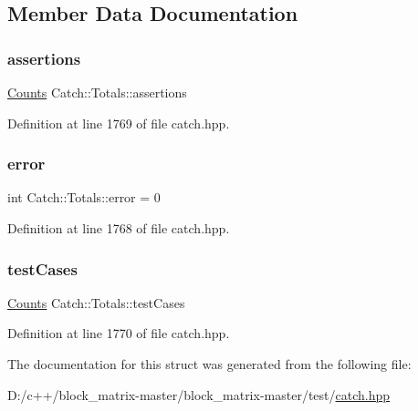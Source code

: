 \subsection{Member Data Documentation}
\mbox{\label{struct_catch_1_1_totals_a885ded66df752147b30c3d45aa602ec9}} 
\subsubsection{\texorpdfstring{assertions}{assertions}}
{\footnotesize\ttfamily \mbox{\hyperlink{struct_catch_1_1_counts}{Counts}} Catch\+::\+Totals\+::assertions}



Definition at line 1769 of file catch.\+hpp.

\mbox{\label{struct_catch_1_1_totals_a6ea14c7de7ea735a14f172a26e08a239}} 
\subsubsection{\texorpdfstring{error}{error}}
{\footnotesize\ttfamily int Catch\+::\+Totals\+::error = 0}



Definition at line 1768 of file catch.\+hpp.

\mbox{\label{struct_catch_1_1_totals_adb195fe477aedee2ecea88c888f16506}} 
\subsubsection{\texorpdfstring{test\+Cases}{testCases}}
{\footnotesize\ttfamily \mbox{\hyperlink{struct_catch_1_1_counts}{Counts}} Catch\+::\+Totals\+::test\+Cases}



Definition at line 1770 of file catch.\+hpp.



The documentation for this struct was generated from the following file\+:\begin{DoxyCompactItemize}
\item 
D\+:/c++/block\+\_\+matrix-\/master/block\+\_\+matrix-\/master/test/\mbox{\hyperlink{catch_8hpp}{catch.\+hpp}}\end{DoxyCompactItemize}
